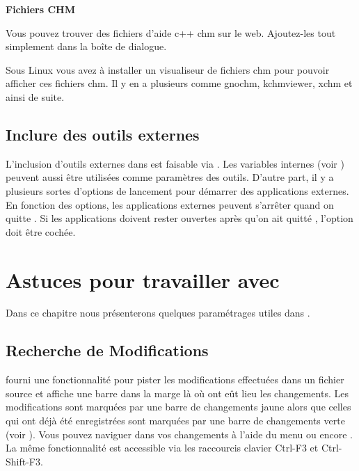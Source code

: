
\textbf{Fichiers CHM}

Vous pouvez trouver des fichiers d'aide c++ chm sur le web. Ajoutez-les tout simplement dans la boîte de dialogue.

Sous Linux vous avez à installer un visualiseur de fichiers chm pour pouvoir afficher ces fichiers chm. Il y en a plusieurs comme gnochm, kchmviewer, xchm et ainsi de suite. 

%

\subsection{Inclure des outils externes}

L'inclusion d'outils externes dans \codeblocks est faisable via . Les variables internes (voir ) peuvent aussi être utilisées comme paramètres des outils. D'autre part, il y a plusieurs sortes d'options de lancement pour démarrer des applications externes. En fonction des options, les applications externes peuvent s'arrêter quand on quitte \codeblocks. Si les applications doivent rester ouvertes après qu'on ait quitté \codeblocks, l'option  doit être cochée.

\section{Astuces pour travailler avec \codeblocks}

Dans ce chapitre nous présenterons quelques paramétrages utiles dans \codeblocks.

\subsection{Recherche de Modifications}

\codeblocks fourni une fonctionnalité pour pister les modifications effectuées dans un fichier source et affiche une barre dans la marge là où ont eût lieu les changements. Les modifications sont marquées par une barre de changements jaune alors que celles qui ont déjà été enregistrées sont marquées par une barre de changements verte (voir ). Vous pouvez naviguer dans vos changements à l'aide du menu   ou encore . La même fonctionnalité est accessible via les raccourcis clavier Ctrl-F3 et Ctrl-Shift-F3.

